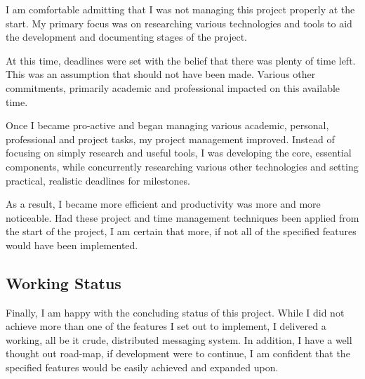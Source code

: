 I am comfortable admitting that I was not managing this project properly
at the start. My primary focus was on researching various technologies
and tools to aid the development and documenting stages of the project.


At this time, deadlines were set with the belief that there was plenty
of time left. This was an assumption that should not have been made.
Various other commitments, primarily academic and professional impacted
on this available time.


Once I became pro-active and began managing various academic, personal,
professional and project tasks, my project management improved. Instead
of focusing on simply research and useful tools, I was developing the
core, essential components, while concurrently researching various other
technologies and setting practical, realistic deadlines for milestones.


As a result, I became more efficient and productivity was more and more
noticeable. Had these project and time management techniques been
applied from the start of the project, I am certain that more, if not
all of the specified features would have been implemented.

\subsection{Working Status}

Finally, I am happy with the concluding status of this project. While I
did not achieve more than one of the features I set out to implement, I
delivered a working, all be it crude, distributed messaging system. In
addition, I have a well thought out road-map, if development were to
continue, I am confident that the specified features would be easily 
achieved and expanded upon. 

